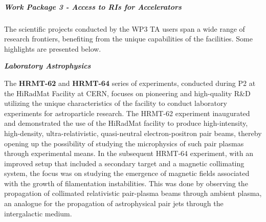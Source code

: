 %
% 
\subparagraph{Work Package 3 - Access to RIs for Accelerators} \mbox{}
\label{sec:wp3_scientific_output}


The scientific projects conducted by the WP3 TA users span a wide range of research frontiers, benefiting from the unique capabilities of the facilities. Some highlights are presented below.

\textbf{\textit{Laboratory Astrophysics}} \mbox{}

The \textbf{HRMT-62} and \textbf{HRMT-64} series of experiments, conducted during P2 at the HiRadMat Facility at CERN, focuses on pioneering and high-quality R\&D utilizing the unique characteristics of the facility to conduct laboratory experiments for astroparticle research. The HRMT-62 experiment inaugurated and demonstrated the use of the HiRadMat facility to produce high-intensity, high-density, ultra-relativistic, quasi-neutral electron-positron pair beams, thereby opening up the possibility of studying the microphysics of such pair plasmas through experimental means.
In the subsequent HRMT-64 experiment, with an improved setup that included a secondary target and a magnetic collimating system, the focus was on studying the emergence of magnetic fields associated with the growth of filamentation instabilities. This was done by observing the propagation of collimated relativistic pair-plasma beams through ambient plasma, an analogue for the propagation of astrophysical pair jets through the intergalactic medium.

